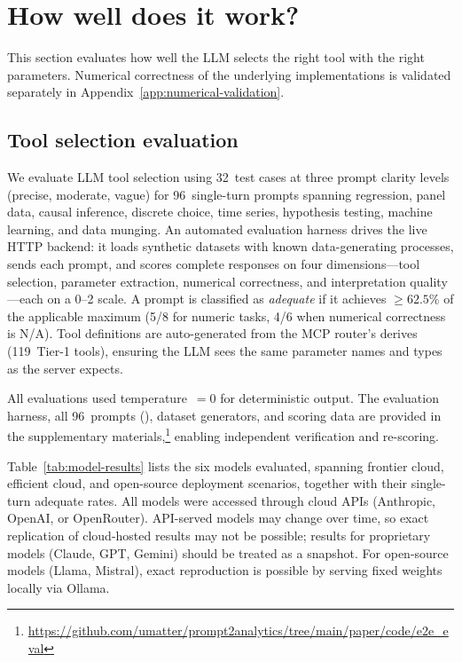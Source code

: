 
\section{How well does it work?} \label{sec:evaluation}

This section evaluates how well the LLM selects the right tool with the
right parameters. Numerical correctness of the underlying 
implementations is validated separately in
Appendix~\ref{app:numerical-validation}.

\subsection{Tool selection evaluation}

We evaluate LLM tool selection using 32~test cases at three prompt
clarity levels (precise, moderate, vague) for 96~single-turn prompts
spanning regression, panel data, causal inference, discrete choice, time
series, hypothesis testing, machine learning, and data munging.  An
automated evaluation harness drives the live  HTTP
backend: it loads synthetic datasets with known data-generating
processes, sends each prompt, and scores complete responses on four
dimensions---tool selection, parameter extraction, numerical correctness,
and interpretation quality---each on a 0--2 scale.  A prompt is
classified as \emph{adequate} if it achieves $\geq 62.5\%$ of the
applicable maximum (5/8 for numeric tasks, 4/6 when numerical
correctness is N/A).  Tool definitions are auto-generated from the MCP
router's  derives (119~Tier-1 tools), ensuring the LLM
sees the same parameter names and types as the server expects.

All evaluations used temperature~$= 0$ for deterministic output.
The evaluation harness, all 96~prompts (),
dataset generators, and scoring data are provided in the supplementary
materials,\footnote{\url{https://github.com/umatter/prompt2analytics/tree/main/paper/code/e2e_eval}} enabling independent
verification and re-scoring.

\noindent Table~\ref{tab:model-results} lists the six models evaluated,
spanning frontier cloud, efficient cloud, and open-source deployment
scenarios, together with their single-turn adequate rates.
All models were accessed through cloud APIs (Anthropic,
OpenAI, or OpenRouter).  API-served models may change over time, so
exact replication of cloud-hosted results may not be possible; results
for proprietary models (Claude, GPT, Gemini) should be treated as a
snapshot.  For open-source models (Llama, Mistral), exact reproduction
is possible by serving fixed weights locally via Ollama.

